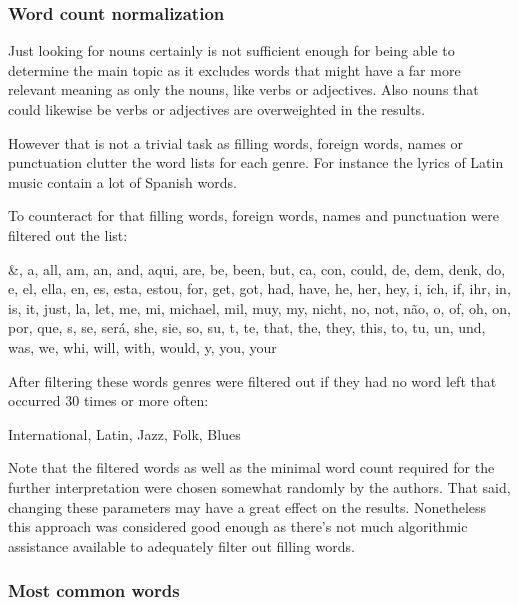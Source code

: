 \documentclass[                                                             %
        12pt,                                                                   %
        twoside                                                                 %
    ]{scrartcl}                                                                 %
\begin{document}
\subsubsection{Word count normalization}\label{sec:word-count-normalization}

Just looking for nouns certainly is not sufficient enough 
for being able to determine the main topic as it excludes words 
that might have a far more relevant meaning as only the nouns,
like verbs or adjectives.
Also nouns that could likewise be verbs or adjectives 
are overweighted in the results.

However that is not a trivial task as filling words, foreign words, names
or punctuation clutter the word lists for each genre.
For instance the lyrics of Latin music contain a lot of Spanish words.

To counteract for that filling words, foreign words, names 
and punctuation were filtered out the list:

\begin{addmargin}{3em}\footnotesize
    \&, a, all, am, an, and, aqui, are, be, been, but, ca, con, could,
    de, dem, denk, do, e, el, ella, en, es, esta, estou, for, get, got,
    had, have, he, her, hey, i, ich, if, ihr, in, is, it, just, la, let,
    me, mi, michael, mil, muy, my, nicht, no, not, não, o, of, oh, on,
    por, que, s, se, será, she, sie, so, su, t, te, that, the, they,
    this, to, tu, un, und, was, we, whi, will, with, would, y, you, your
\end{addmargin}

After filtering these words genres were filtered out 
if they had no word left that occurred 30 times or more often:

\begin{addmargin}{3em}
    International, Latin, Jazz, Folk, Blues
\end{addmargin}

Note that the filtered words as well as the minimal word count required 
for the further interpretation were chosen somewhat randomly by the authors.
That said, changing these parameters may have a great effect on the results. 
Nonetheless this approach was considered good enough as there's not much 
algorithmic assistance available to adequately filter out filling words.

\subsubsection{Most common words}
\end{document}
